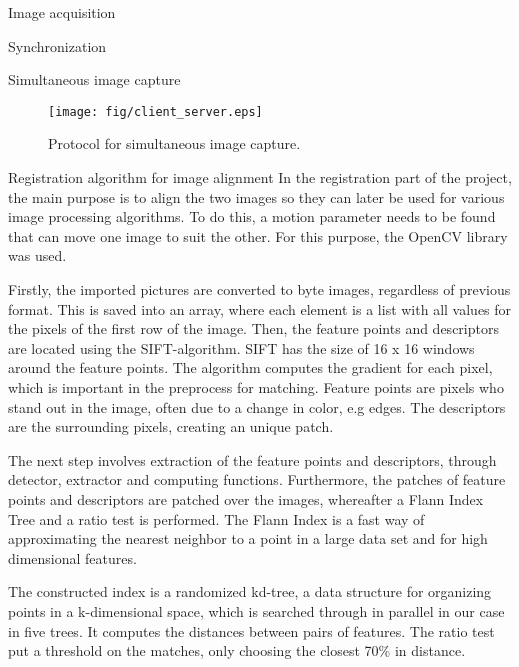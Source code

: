 \documentclass[10pt]{article}
\begin{document}
\begin{section}{Image acquisition}
\begin{subsection}{Synchronization}
\begin{subsubsection}{Simultaneous image capture}
            \begin{figure}[!h]
                \begin{center}
                    \texttt{[image: fig/client\_server.eps]}
                    \caption{Protocol for simultaneous image capture.}
                    \label{fig:client_server}
                \end{center}
            \end{figure}
        \end{subsubsection}

    \end{subsection} %

    \begin{subsection}{Registration algorithm for image alignment}
        \label{sec:image_registration}
        In the registration part of the project, the main purpose is to align the two images so they can later be used for various image processing algorithms. To do this, a motion parameter needs to be found that can move one image to suit the other. For this purpose, the OpenCV library was used.

        \medskip

        Firstly, the imported pictures are converted to byte images, regardless of previous format. This is saved into an array, where each element is a list with all values for the pixels of the first row of the image. Then, the feature points and descriptors are located using the SIFT-algorithm. SIFT has the size of 16 x 16 windows around the feature points. The algorithm computes the gradient for each pixel, which is important in the preprocess for matching. Feature points are pixels who stand out in the image, often due to a change in color, e.g edges. The descriptors are the surrounding pixels, creating an unique patch.

        \medskip

        The next step involves extraction of the feature points and descriptors, through detector, extractor and computing functions. Furthermore, the patches of feature points and descriptors are patched over the images, whereafter a Flann Index Tree and a ratio test is performed. The Flann Index is a fast way of approximating the nearest neighbor to a point in a large data set and for high dimensional features.

        \medskip

        The constructed index is a randomized kd-tree, a data structure for organizing points in a k-dimensional space, which is searched through in parallel in our case in five trees. It computes the distances between pairs of features. The ratio test put a threshold on the matches, only choosing the closest 70\% in distance.


\end{subsection}
\end{section}
\end{document}
